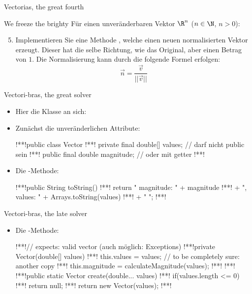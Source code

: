 \begin{frame}[fragile, c]{Vectorias, the great fourth}
\begin{aufgabe}{We freeze the brighty}
Für einen unveränderbaren Vektor \(\R^n\) (\(n \in \N\), \(n > 0\)): \begin{enumerate}[<+(1)->]
    \setcounter{enumi}{4}
    \item Implementieren Sie eine Methode , welche einen neuen normalisierten Vektor erzeugt.\pause{}
    Dieser hat die selbe Richtung, wie das Original, aber einen Betrag von \(1\). Die Normalisierung kann durch die folgende Formel erfolgen: \begin{equation*}
        \vec{n} = \frac{\vec{v}}{||\vec{v}||}
    \end{equation*}
\end{enumerate}
\end{aufgabe}
\end{frame}

\begin{frame}[fragile]{Vectori-bras, the great solver}
    \begin{itemize}[<+(1)->]
        \item Hier die Klasse an sich: 
        \item Zunächst die unveränderlichen Attribute:
\begin{plainjava}
!**!public class Vector {
!**!    private final double[] values; // darf nicht public sein
!**!    public final double magnitude; // oder mit getter
!**!}
\end{plainjava}
        \item<6-> Die -Methode:
\begin{plainjava}
!**!public String toString() {
!**!    return "{ magnitude: " + magnitude
!**!         + ", values: " + Arrays.toString(values)
!**!         + " }";
!**!}
\end{plainjava}
    \end{itemize}
\end{frame}

\begin{frame}[fragile]{Vectori-bras, the late solver}
    \begin{itemize}[<+(1)->]
        \item Die -Methode:
\begin{plainjava}
!**!// expects: valid vector (auch möglich: Exceptions)
!**!private Vector(double[] values) {
!**!    this.values = values; // to be completely sure: another copy
!**!    this.magnitude = calculateMagnitude(values);
!**!}
!**!
!**!public static Vector create(double... values) {
!**!    if(values.length <= 0)
!**!        return null;
!**!    return new Vector(values);
!**!}
\end{plainjava}
    \end{itemize}
\end{frame}


